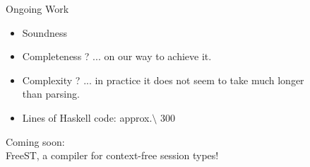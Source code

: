 \documentclass[10pt]{beamer}
\begin{document}
\begin{frame} {Ongoing Work}
	\begin{itemize}
		\item Soundness {\color{olive}\checkmark}
		\item Completeness {\color{orange}?} {\color{gray} ... on our way to achieve it.}
		\item Complexity {\color{orange}?} {\color{gray} ... in practice it does not seem to take much longer \\\hspace*{2.4cm} than parsing.}
		\item Lines of Haskell code: approx.$\setminus$ $300$
	\end{itemize}
	
	{\color{teal}Coming soon: }\\\smallskip
	\textsf{FreeST}, a compiler for context-free session types!\\
\end{frame}

\end{document}
